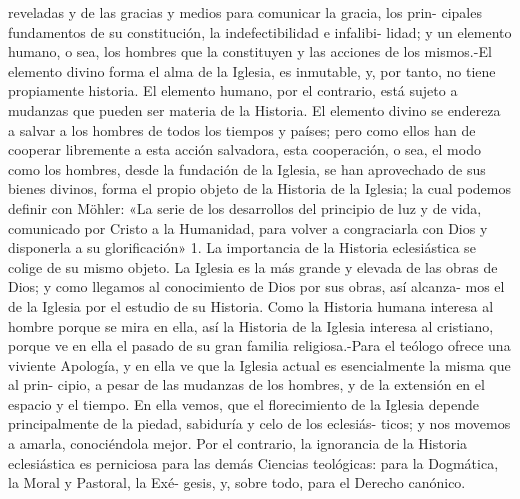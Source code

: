 \raggedbottom{} \documentclass[12pt, a4paper]{book}
\begin{document}
reveladas y de las gracias y medios para comunicar la gracia, los prin-
cipales fundamentos de su constitución, la indefectibilidad e infalibi-
lidad; y un elemento humano, o sea, los hombres que la constituyen
y las acciones de los mismos.-El elemento divino forma el alma de
la Iglesia, es inmutable, y, por tanto, no tiene propiamente historia.
El elemento humano, por el contrario, está sujeto a mudanzas que
pueden ser materia de la Historia. El elemento divino se endereza a
salvar a los hombres de todos los tiempos y países; pero como ellos
han de cooperar libremente a esta acción salvadora, esta cooperación,
o sea, el modo como los hombres, desde la fundación de la Iglesia, se
han aprovechado de sus bienes divinos, forma el propio objeto de la
Historia de la Iglesia; la cual podemos definir con Möhler: «La serie
de los desarrollos del principio de luz y de vida, comunicado por Cristo
a la Humanidad, para volver a congraciarla con Dios y disponerla a su
glorificación» 1.
La importancia de la Historia eclesiástica se colige de su mismo
objeto. La Iglesia es la más grande y elevada de las obras de Dios;
y como llegamos al conocimiento de Dios por sus obras, así alcanza-
mos el de la Iglesia por el estudio de su Historia. Como la Historia
humana interesa al hombre porque se mira en ella, así la Historia de
la Iglesia interesa al cristiano, porque ve en ella el pasado de su gran
familia religiosa.-Para el teólogo ofrece una viviente Apología, y en
ella ve que la Iglesia actual es esencialmente la misma que al prin-
cipio, a pesar de las mudanzas de los hombres, y de la extensión en el
espacio y el tiempo. En ella vemos, que el florecimiento de la Iglesia
depende principalmente de la piedad, sabiduría y celo de los eclesiás-
ticos; y nos movemos a amarla, conociéndola mejor. Por el contrario,
la ignorancia de la Historia eclesiástica es perniciosa para las demás
Ciencias teológicas: para la Dogmática, la Moral y Pastoral, la Exé-
gesis, y, sobre todo, para el Derecho canónico.
\end{document}
